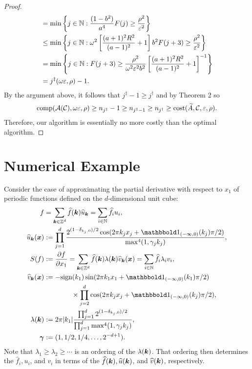 \documentclass[graybox,footinfo]{svmult}
\newcommand{\DHJRabs}[1]{\ensuremath{{\left \lvert #1 \right \rvert}}}
\begin{document}
\begin{proof}
\begin{align*}
& =
 \min \left \{j \in {\mathbb{N}} : \frac{(1 - b^2)}{a^4} F(j) \ge \frac{\rho^2 }{\varepsilon^2 }   \right\} \\
& \le \min \left \{j \in {\mathbb{N}} : \omega^2\left[\frac{(a+1)^{2} R^2 }{(a-1)^2} + 1\right] b^2 F(j+3) \ge \frac{\rho^2}{\varepsilon^2}  \right\} \\
& = \min \left \{j \in {\mathbb{N}} :  F(j+3) \ge \frac{\rho^2}{\omega^2 \varepsilon^2 b^2} \left[\frac{(a+1)^{2} R^2 }{(a-1)^2} + 1\right]^{-1} \right\} \\
& = j^{\ddagger}(\omega\varepsilon,\rho) - 1.
\end{align*}
By the argument above, it follows that $j^\ddagger -1 \ge j^\dagger$ and by Theorem 2 so
\[
\textup{comp}({\mathcal{A}}({\mathcal{C}}),\omega\varepsilon,\rho) \ge n_{j^{\ddagger}} -1 \ge n_{j^{\ddagger}-1} \ge  n_{j^\dagger}\ge \textup{cost}(\widetilde{A},{\mathcal{C}},\varepsilon,\rho) .\]
Therefore, our algorithm is essentially no more costly than the optimal algorithm. 
\end{proof}

 


\section{Numerical Example} \label{sec:examp}

Consider the case of approximating the  partial derivative with respect to $x_1$ of periodic functions defined on the $d$-dimensional unit cube:
\begin{align*}
\allowdisplaybreaks
f &= \sum_{\bsk \in \bbZ^d} \widehat{f}(\bsk) \widehat{u}_{\bsk} = \sum_{i \in \bbN} \widehat{f}_i u_i , \\
\widehat{u}_{\bsk} (\bsx) &:= \prod_{j=1}^d \frac{2^{(1-\delta_{k_j,0})/2}\cos(2\pi k_j x_j  + \bbone_{(-\infty,0)}(k_j) \pi/2 )}{\max^4(1,\gamma_j k_j)},  \\ 
S(f) &: = \frac{\partial f}{\partial x_1} = \sum_{\bsk \in \bbZ^d} \widehat{f}(\bsk) \lambda(\bsk) \widehat{v}_{\bsk} (\bsx)
= \sum_{i \in \bbN} \widehat{f}_i \lambda_i v_i, \\ 
\widehat{v}_{\bsk}(\bsx) & : =  -\textup{sign}(k_1)  \sin(2\pi k_1 x_1  + \bbone_{(-\infty,0)}(k_1) \pi/2 ) \\
& \qquad \qquad \times \prod_{j=2}^d
\cos(2\pi k_j x_j  + \bbone_{(-\infty,0)}(k_j) \pi/2 ), \\ 
\lambda(\bsk) &:= 2 \pi \DHJRabs{k_1}\frac{\prod_{j=1}^d 2^{(1-\delta_{k_j,0})/2}}{\prod_{j=1}^d\max^4(1,\gamma_j k_j)}, \\
\boldsymbol{\gamma} & := (1,1/2, 1/4, \ldots, 2^{-d+1}).
\end{align*}
Note that $\lambda_1 \ge \lambda_2 \ge \cdots$ is an ordering of the $\lambda({\boldsymbol{k}})$.  That ordering then determines the $\widehat{f}_i, u_i$, and $v_i$ in terms of the $\widehat{f}({\boldsymbol{k}}), \widehat{u}({\boldsymbol{k}})$, and $\widehat{v}({\boldsymbol{k}})$, respectively.
\end{document}
